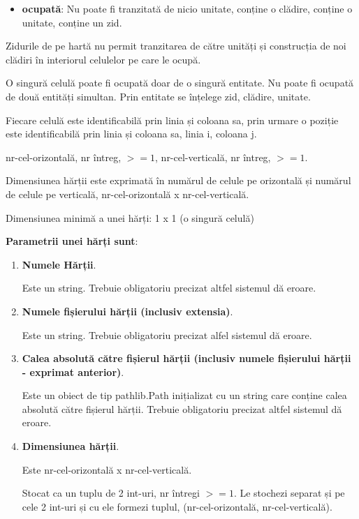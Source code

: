 \documentclass{article}
\begin{document}
\begin{enumerate}
\begin{itemize}
            \item \textbf{ocupată}: Nu poate fi tranzitată de nicio unitate, conține o clădire, conține o unitate, conține un zid.
        \end{itemize}

        Zidurile de pe hartă nu permit tranzitarea de către unități și construcția de noi clădiri în interiorul celulelor pe care le ocupă.

        O singură celulă poate fi ocupată doar de o singură entitate. Nu poate fi ocupată de două entități simultan. Prin entitate se înțelege zid, clădire, unitate.

        Fiecare celulă este identificabilă prin linia și coloana sa, prin urmare o poziție este identificabilă prin linia și coloana sa, linia i, coloana j.

        nr-cel-orizontală, nr întreg, $>=1$, nr-cel-verticală, nr întreg, $>=1$.

        Dimensiunea hărții este exprimată în numărul de celule pe orizontală și numărul de celule pe verticală, nr-cel-orizontală x nr-cel-verticală.

        Dimensiunea minimă a unei hărți: 1 x 1 (o singură celulă)

        \textbf{Parametrii unei hărți sunt}:
        \begin{enumerate}
            \item \textbf{Numele Hărții}.

                Este un string. Trebuie obligatoriu precizat altfel sistemul dă eroare.

            \item \textbf{Numele fișierului hărții (inclusiv extensia)}.

                Este un string. Trebuie obligatoriu precizat alfel sistemul dă eroare.

            \item \textbf{Calea absolută către fișierul hărții (inclusiv numele fișierului hărții - exprimat anterior)}.

                Este un obiect de tip pathlib.Path inițializat cu un string care conține calea absolută către fișierul hărții. Trebuie obligatoriu precizat altfel sistemul dă eroare.

            \item \textbf{Dimensiunea hărții}.

                Este nr-cel-orizontală x nr-cel-verticală.

                Stocat ca un tuplu de 2 int-uri, nr întregi $>=1$. Le stochezi separat și pe cele 2 int-uri și cu ele formezi tuplul, (nr-cel-orizontală, nr-cel-verticală).


\end{enumerate}
\end{enumerate}
\end{document}
